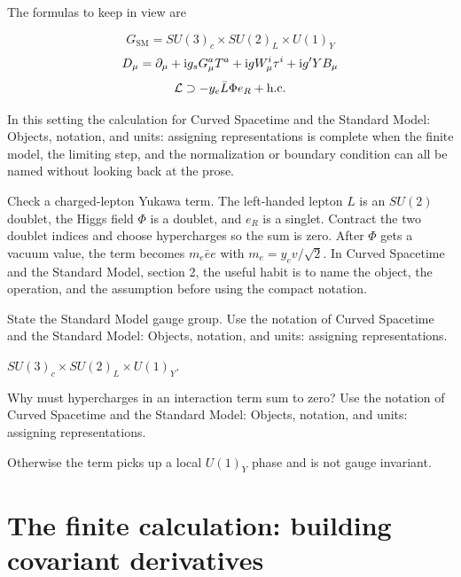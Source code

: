 The formulas to keep in view are

\[
  G_{\mathrm{SM}}=SU(3)_c\times SU(2)_L\times U(1)_Y
\]
\[
  D_\mu=\partial_\mu+\mathrm i g_sG_\mu^aT^a+\mathrm i gW_\mu^i\tau^i+\mathrm i g'YB_\mu
\]
\[
  \mathcal L\supset -y_e\bar L\Phi e_R+\hbox{h.c.}
\]

In this setting the calculation for Curved Spacetime and the Standard Model: Objects, notation, and units: assigning representations is complete when the finite model, the limiting step, and the normalization or boundary condition can all be named without looking back at the prose.




\begin{example}
Check a charged-lepton Yukawa term.  The left-handed lepton \(L\) is an \(SU(2)\) doublet, the Higgs field \(\Phi\) is a doublet, and \(e_R\) is a singlet.  Contract the two doublet indices and choose hypercharges so the sum is zero.  After \(\Phi\) gets a vacuum value, the term becomes \(m_e\bar e e\) with \(m_e=y_ev/\sqrt2\).  In Curved Spacetime and the Standard Model, section 2, the useful habit is to name the object, the operation, and the assumption before using the compact notation.
\end{example}



\begin{exercise}
State the Standard Model gauge group.  Use the notation of Curved Spacetime and the Standard Model: Objects, notation, and units: assigning representations.
\begin{answer}
\(SU(3)_c\times SU(2)_L\times U(1)_Y\).
\end{answer}
\end{exercise}

\begin{exercise}
Why must hypercharges in an interaction term sum to zero?  Use the notation of Curved Spacetime and the Standard Model: Objects, notation, and units: assigning representations.
\begin{answer}
Otherwise the term picks up a local \(U(1)_Y\) phase and is not gauge invariant.
\end{answer}
\end{exercise}



\section{The finite calculation: building covariant derivatives}

